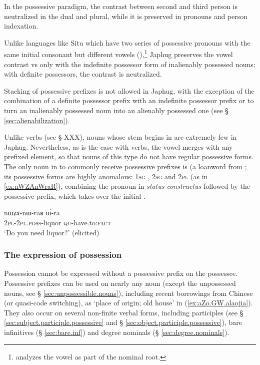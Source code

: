 In the possessive paradigm, the contrast between second and third person is neutralized in the dual and plural, while it is preserved in pronouns and person indexation.

Unlike languages like Situ which have two series of possessive pronouns with the same initial consonant but different vowels (\citealt[168-169]{linxr93jiarongen}),\footnote{\citet[118-119]{prins16kyomkyo} analyzes the vowel as part of the nominal root.} Japhug preserves the vowel contrast  vs  only with the indefinite possessor form of inalienably possessed nouns; with definite possessors, the contrast is neutralized.

Stacking of possessive prefixes is not allowed in Japhug, with the exception of the combination of a definite possessor prefix with an indefinite possessor prefix  or  to turn an inalienably possessed noun into an alienably possessed one (see § \ref{sec:alienabilization}).

Unlike verbs (see § XXX), nouns whose stem begins in  are extremely few in Japhug. Nevertheless, as is the case with verbs, the vowel  merges with any prefixed element, so that nouns of this type do not have regular possessive forms. The only noun in  to commonly receive possessive prefixes is  (a loanword from ; its possessive forms are highly anomalous: \textsc{1sg} , \textsc{2sg}  and \textsc{2pl}  (as in \ref{ex:nWZAnWraR}), combining the pronoun in \textit{status constructus} followed by the possessive prefix, which takes over the initial .

\begin{exe}
\ex \label{ex:nWZAnWraR}
\gll nɯʑɤ-nɯ-raʁ ɯ́-ra \\
\textsc{2pl}-\textsc{2pl.poss}-liquor \textsc{qu}-have.to:\textsc{fact} \\
\glt `Do you need liquor?' (elicited)
\end{exe}

\subsubsection{The expression of possession} \label{ex:prefix.expression.of.possession}
Possession cannot be expressed without a possessive prefix on the possessee. Possessive prefixes can be used on nearly any noun (except the unpossessed nouns, see § \ref{sec:unpossessible.nouns}), including recent borrowings from Chinese (or quasi-code switching), as   `place of origin; old house' in (\ref{ex:aZo.GW.alaojia}). They also occur on several non-finite verbal forms, including participles (see § \ref{sec:subject.participle.possessive} and § \ref{sec:object.participle.possessive}), bare infinitives (§ \ref{sec:bare.inf}) and degree nominals (§ \ref{sec:degree.nominals}).


